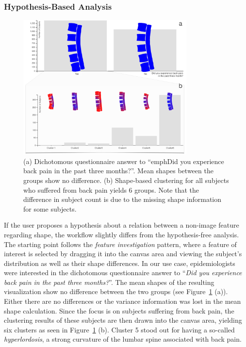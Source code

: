 \documentclass[journal]{style/vgtc} 			          %
\begin{document}
\subsubsection{Hypothesis-Based Analysis} \label{Hypothesis based Analysis}
\begin{figure}[htb]
 \centering
 \includegraphics[width=3.5in]{figures/hypothesisbased}
 \caption{(a) Dichotomous questionnaire answer to ``emph{Did you experience back pain in the past three months?}''.
 Mean shapes between the groups show no difference.
 (b) Shape-based clustering for all subjects who suffered from back pain yields 6 groups. 
 Note that the difference in subject count is due to the missing shape information for some subjects.
 }
 \label{fig:hypopthesisbased}
\end{figure}
%
If the user proposes a hypothesis about a relation between a non-image feature regarding shape, the workflow slightly differs from the hypothesis-free analysis.
%
The starting point follows the \emph{feature investigation} pattern, where a feature of interest is selected by dragging it into the canvas area and viewing the subject's distribution as well as their shape differences.
%
In our use case, epidemiologists were interested in the dichotomous questionnaire answer to ``\emph{Did you experience back pain in the past three months?}''.
%
The mean shapes of the resulting visualization show no difference between the two groups (see Figure~\ref{fig:hypopthesisbased} (a)).
%
Either there are no differences or the variance information was lost in the mean shape calculation.
%
Since the focus is on subjects suffering from back pain, the clustering results of these subjects are then drawn into the canvas area, yielding six clusters as seen in Figure~\ref{fig:hypopthesisbased} (b).
%
Cluster 5 stood out for having a so-called \emph{hyperlordosis}, a strong curvature of the lumbar spine associated with back pain.
\end{document}
